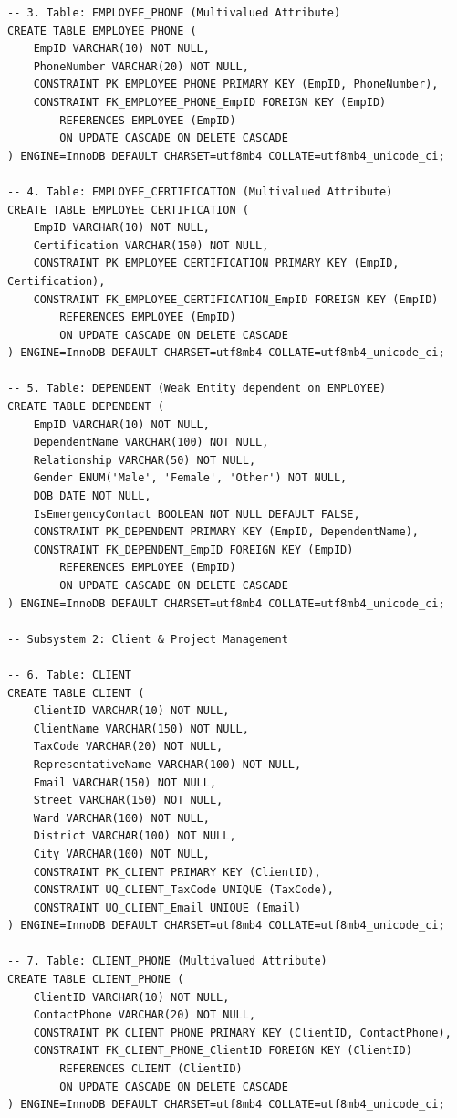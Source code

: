 \documentclass[a4paper,12pt]{report}
\begin{document}
\begin{lstlisting}
-- 3. Table: EMPLOYEE_PHONE (Multivalued Attribute)
CREATE TABLE EMPLOYEE_PHONE (
    EmpID VARCHAR(10) NOT NULL,
    PhoneNumber VARCHAR(20) NOT NULL,
    CONSTRAINT PK_EMPLOYEE_PHONE PRIMARY KEY (EmpID, PhoneNumber),
    CONSTRAINT FK_EMPLOYEE_PHONE_EmpID FOREIGN KEY (EmpID)
        REFERENCES EMPLOYEE (EmpID)
        ON UPDATE CASCADE ON DELETE CASCADE
) ENGINE=InnoDB DEFAULT CHARSET=utf8mb4 COLLATE=utf8mb4_unicode_ci;

-- 4. Table: EMPLOYEE_CERTIFICATION (Multivalued Attribute)
CREATE TABLE EMPLOYEE_CERTIFICATION (
    EmpID VARCHAR(10) NOT NULL,
    Certification VARCHAR(150) NOT NULL,
    CONSTRAINT PK_EMPLOYEE_CERTIFICATION PRIMARY KEY (EmpID, Certification),
    CONSTRAINT FK_EMPLOYEE_CERTIFICATION_EmpID FOREIGN KEY (EmpID)
        REFERENCES EMPLOYEE (EmpID)
        ON UPDATE CASCADE ON DELETE CASCADE
) ENGINE=InnoDB DEFAULT CHARSET=utf8mb4 COLLATE=utf8mb4_unicode_ci;

-- 5. Table: DEPENDENT (Weak Entity dependent on EMPLOYEE)
CREATE TABLE DEPENDENT (
    EmpID VARCHAR(10) NOT NULL,
    DependentName VARCHAR(100) NOT NULL,
    Relationship VARCHAR(50) NOT NULL,
    Gender ENUM('Male', 'Female', 'Other') NOT NULL,
    DOB DATE NOT NULL,
    IsEmergencyContact BOOLEAN NOT NULL DEFAULT FALSE,
    CONSTRAINT PK_DEPENDENT PRIMARY KEY (EmpID, DependentName),
    CONSTRAINT FK_DEPENDENT_EmpID FOREIGN KEY (EmpID)
        REFERENCES EMPLOYEE (EmpID)
        ON UPDATE CASCADE ON DELETE CASCADE
) ENGINE=InnoDB DEFAULT CHARSET=utf8mb4 COLLATE=utf8mb4_unicode_ci;

-- Subsystem 2: Client & Project Management

-- 6. Table: CLIENT
CREATE TABLE CLIENT (
    ClientID VARCHAR(10) NOT NULL,
    ClientName VARCHAR(150) NOT NULL,
    TaxCode VARCHAR(20) NOT NULL,
    RepresentativeName VARCHAR(100) NOT NULL,
    Email VARCHAR(150) NOT NULL,
    Street VARCHAR(150) NOT NULL,
    Ward VARCHAR(100) NOT NULL,
    District VARCHAR(100) NOT NULL,
    City VARCHAR(100) NOT NULL,
    CONSTRAINT PK_CLIENT PRIMARY KEY (ClientID),
    CONSTRAINT UQ_CLIENT_TaxCode UNIQUE (TaxCode),
    CONSTRAINT UQ_CLIENT_Email UNIQUE (Email)
) ENGINE=InnoDB DEFAULT CHARSET=utf8mb4 COLLATE=utf8mb4_unicode_ci;

-- 7. Table: CLIENT_PHONE (Multivalued Attribute)
CREATE TABLE CLIENT_PHONE (
    ClientID VARCHAR(10) NOT NULL,
    ContactPhone VARCHAR(20) NOT NULL,
    CONSTRAINT PK_CLIENT_PHONE PRIMARY KEY (ClientID, ContactPhone),
    CONSTRAINT FK_CLIENT_PHONE_ClientID FOREIGN KEY (ClientID)
        REFERENCES CLIENT (ClientID)
        ON UPDATE CASCADE ON DELETE CASCADE
) ENGINE=InnoDB DEFAULT CHARSET=utf8mb4 COLLATE=utf8mb4_unicode_ci;


\end{lstlisting}
\end{document}
